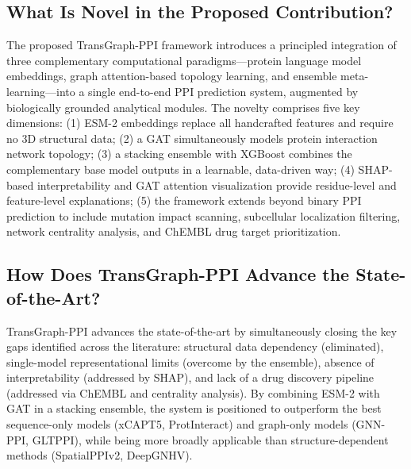 \documentclass[12pt,a4paper]{report}
\begin{document}
\subsection{What Is Novel in the Proposed Contribution?}
The proposed TransGraph-PPI framework introduces a principled integration of three complementary computational paradigms—protein language model embeddings, graph attention-based topology learning, and ensemble meta-learning—into a single end-to-end PPI prediction system, augmented by biologically grounded analytical modules. The novelty comprises five key dimensions: (1) ESM-2 embeddings replace all handcrafted features and require no 3D structural data; (2) a GAT simultaneously models protein interaction network topology; (3) a stacking ensemble with XGBoost combines the complementary base model outputs in a learnable, data-driven way; (4) SHAP-based interpretability and GAT attention visualization provide residue-level and feature-level explanations; (5) the framework extends beyond binary PPI prediction to include mutation impact scanning, subcellular localization filtering, network centrality analysis, and ChEMBL drug target prioritization.

\subsection{How Does TransGraph-PPI Advance the State-of-the-Art?}
TransGraph-PPI advances the state-of-the-art by simultaneously closing the key gaps identified across the literature: structural data dependency (eliminated), single-model representational limits (overcome by the ensemble), absence of interpretability (addressed by SHAP), and lack of a drug discovery pipeline (addressed via ChEMBL and centrality analysis). By combining ESM-2 with GAT in a stacking ensemble, the system is positioned to outperform the best sequence-only models (xCAPT5, ProtInteract) and graph-only models (GNN-PPI, GLTPPI), while being more broadly applicable than structure-dependent methods (SpatialPPIv2, DeepGNHV).

\newpage

\end{document}
